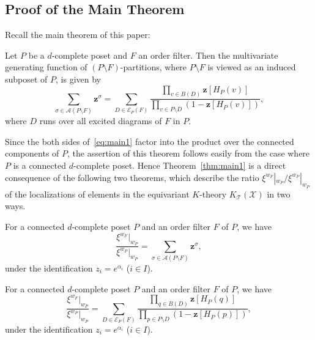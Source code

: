 \documentclass[ALCO,ThmDefs,Unicode,epreuves]{cedram}
\newcommand\vectz{\boldsymbol{z}}
\newcommand\AP{\mathcal{A}}
\newcommand\EE{\mathcal{E}}
\newcommand\TT{\mathcal{T}}
\newcommand\XX{\mathcal{X}}
\begin{document}
\subsection{
Proof of the Main Theorem
}

Recall the main theorem of this paper:

\begin{theo}
\label{thm:main1}
Let $P$ be a $d$-complete poset and $F$ an order filter.
Then the multivariate generating function of $(P \setminus F)$-partitions, 
where $P \setminus F$ is viewed as an induced subposet of $P$, is given by
\begin{equation}
\label{eq:main1}
\sum_{\sigma \in \AP(P \setminus F)} \vectz^\sigma
 =
\sum_{D \in \EE_P(F)}
 \frac{ \prod_{v \in B(D)} \vectz[H_P(v)] }
 { \prod_{v \in P \setminus D} ( 1 - \vectz[H_P(v)] ) },
\end{equation}
where $D$ runs over all excited diagrams of $F$ in $P$.
\end{theo}

Since the both sides of~\eqref{eq:main1} factor into the product over the connected components of $P$, 
the assertion of this theorem follows easily from the case where $P$ is a connected $d$-complete poset.
Hence Theorem~\ref{thm:main1} is a direct consequence of the following two theorems, 
which describe the ratio $\xi^{w_F}|_{w_P} \big/ \xi^{w_P}|_{w_P}$ of the localizations of elements 
in the equivariant $K$-theory $K_\TT(\XX)$ in two ways.

\begin{theo}
\label{thm:xi1}
For a connected $d$-complete poset $P$ and an order filter $F$ of $P$, we have
\begin{equation}
\label{eq:xi1}
\frac{ \xi^{w_F}|_{w_P} }
 { \xi^{w_P}|_{w_P} }
 =
\sum_{\sigma \in \AP(P \setminus F)} \vectz^\sigma,
\end{equation}
under the identification $z_i = e^{\alpha_i}$ \textup{(}$i \in I$\textup{)}.
\end{theo}

\begin{theo}
\label{thm:xi2}
For a connected $d$-complete poset $P$ and an order filter $F$ of $P$, we have
\begin{equation}
\label{eq:xi2}
\frac{ \xi^{w_F}|_{w_P} }
 { \xi^{w_P}|_{w_P} }
 =
\sum_{D \in \EE_P(F)}
 \frac{ \prod_{q \in B(D)} \vectz[H_P(q)] }
 { \prod_{p \in P \setminus D} (1 - \vectz[H_P(p)]) },
\end{equation}
under the identification $z_i = e^{\alpha_i}$ \textup{(}$i \in I$\textup{)}.
\end{theo}
\end{document}
